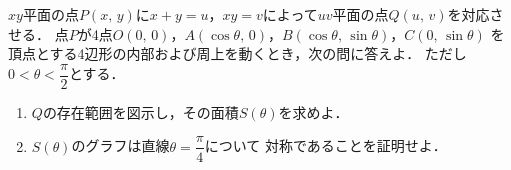 \documentclass[../../main.tex]{subfiles}
\begin{document}
$xy$平面の点$P(x, \, y)$に$x+y=u$，$xy=v$によって$uv$平面の点$Q(u, \, v)$を対応させる．
点$P$が4点$O(0, \, 0)$，$A(\cos\theta, \, 0)$，$B(\cos\theta, \, \sin\theta)$，$C(0, \, \sin\theta)$
を頂点とする4辺形の内部および周上を動くとき，次の問に答えよ．
ただし$\displaystyle0<\theta<\dfrac{\pi}{2}$とする．
\begin{enumerate}
  \item $Q$の存在範囲を図示し，その面積$S(\theta)$を求めよ．
  \item $S(\theta)$のグラフは直線$\displaystyle\theta=\dfrac{\pi}{4}$について
    対称であることを証明せよ．
\end{enumerate}
\end{document}
